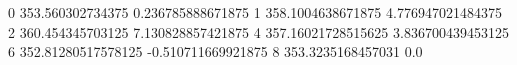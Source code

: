 0 353.560302734375 0.236785888671875
1 358.1004638671875 4.776947021484375
2 360.454345703125 7.130828857421875
4 357.16021728515625 3.836700439453125
6 352.81280517578125 -0.510711669921875
8 353.3235168457031 0.0
